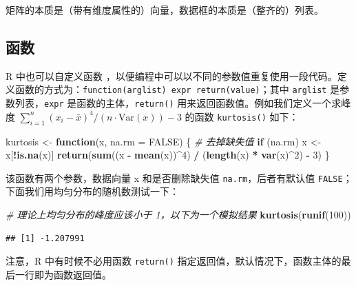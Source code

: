 \documentclass[
  b5paper,
  UTF8,twoside]{book}
\newenvironment{Shaded}{\begin{snugshade}}{\end{snugshade}}
\newcommand{\AttributeTok}[1]{\textcolor[rgb]{0.13,0.29,0.53}{#1}}
\newcommand{\CommentTok}[1]{\textcolor[rgb]{0.56,0.35,0.01}{\textit{#1}}}
\newcommand{\ConstantTok}[1]{\textcolor[rgb]{0.56,0.35,0.01}{#1}}
\newcommand{\ControlFlowTok}[1]{\textcolor[rgb]{0.13,0.29,0.53}{\textbf{#1}}}
\newcommand{\DecValTok}[1]{\textcolor[rgb]{0.00,0.00,0.81}{#1}}
\newcommand{\FunctionTok}[1]{\textcolor[rgb]{0.13,0.29,0.53}{\textbf{#1}}}
\newcommand{\NormalTok}[1]{#1}
\newcommand{\OtherTok}[1]{\textcolor[rgb]{0.56,0.35,0.01}{#1}}
\newcommand{\SpecialCharTok}[1]{\textcolor[rgb]{0.81,0.36,0.00}{\textbf{#1}}}
\begin{document}
矩阵的本质是（带有维度属性的）向量，数据框的本质是（整齐的）列表。

\subsection{函数}\label{ux51fdux6570}

R 中也可以自定义函数 ，以便编程中可以以不同的参数值重复使用一段代码。定义函数的方式为：\texttt{function(arglist)\ expr\ return(value)}；其中 \texttt{arglist} 是参数列表，\texttt{expr} 是函数的主体，\texttt{return()} 用来返回函数值。例如我们定义一个求峰度 \(\sum_{i=1}^{n}(x_{i}-\bar{x})^{4}/(n\cdot\mathrm{Var}(x))-3\) 的函数 \texttt{kurtosis()} 如下：

\begin{Shaded}
\begin{Highlighting}[]
\NormalTok{kurtosis }\OtherTok{\textless{}{-}} \ControlFlowTok{function}\NormalTok{(x, }\AttributeTok{na.rm =} \ConstantTok{FALSE}\NormalTok{) \{}
  \CommentTok{\# 去掉缺失值}
  \ControlFlowTok{if}\NormalTok{ (na.rm) x }\OtherTok{\textless{}{-}}\NormalTok{ x[}\SpecialCharTok{!}\FunctionTok{is.na}\NormalTok{(x)]}
  \FunctionTok{return}\NormalTok{(}\FunctionTok{sum}\NormalTok{((x }\SpecialCharTok{{-}} \FunctionTok{mean}\NormalTok{(x))}\SpecialCharTok{\^{}}\DecValTok{4}\NormalTok{) }\SpecialCharTok{/}\NormalTok{ (}\FunctionTok{length}\NormalTok{(x) }\SpecialCharTok{*} \FunctionTok{var}\NormalTok{(x)}\SpecialCharTok{\^{}}\DecValTok{2}\NormalTok{) }\SpecialCharTok{{-}} \DecValTok{3}\NormalTok{)}
\NormalTok{\}}
\end{Highlighting}
\end{Shaded}

该函数有两个参数，数据向量 x 和是否删除缺失值 \texttt{na.rm}，后者有默认值 \texttt{FALSE}；下面我们用均匀分布的随机数测试一下：

\begin{Shaded}
\begin{Highlighting}[]
\CommentTok{\# 理论上均匀分布的峰度应该小于 1，以下为一个模拟结果}
\FunctionTok{kurtosis}\NormalTok{(}\FunctionTok{runif}\NormalTok{(}\DecValTok{100}\NormalTok{))}
\end{Highlighting}
\end{Shaded}

\begin{verbatim}
## [1] -1.207991
\end{verbatim}

注意，R 中有时候不必用函数 \texttt{return()} 指定返回值，默认情况下，函数主体的最后一行即为函数返回值。
\end{document}
